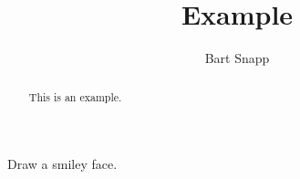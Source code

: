 \documentclass[noauthor,nooutcomes,12pt]{ximera}
\title{Example}
\author{Bart Snapp}
\begin{document}
\begin{abstract}
This is an example.
\end{abstract}
\maketitle

\nameblankgen

\begin{problem}
  Draw a smiley face.
\end{problem}
\end{document}

